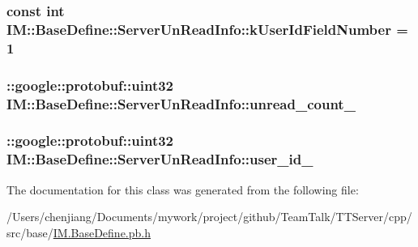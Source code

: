 \subsubsection[{k\+User\+Id\+Field\+Number}]{\setlength{\rightskip}{0pt plus 5cm}const int I\+M\+::\+Base\+Define\+::\+Server\+Un\+Read\+Info\+::k\+User\+Id\+Field\+Number = 1\hspace{0.3cm}{\ttfamily [static]}}\label{class_i_m_1_1_base_define_1_1_server_un_read_info_a482be31f066cdb6df95c468d3259c981}
\hypertarget{class_i_m_1_1_base_define_1_1_server_un_read_info_a7540121ccfaddc5aaff134c8c472cc45}{}
\subsubsection[{unread\+\_\+count\+\_\+}]{\setlength{\rightskip}{0pt plus 5cm}\+::google\+::protobuf\+::uint32 I\+M\+::\+Base\+Define\+::\+Server\+Un\+Read\+Info\+::unread\+\_\+count\+\_\+\hspace{0.3cm}{\ttfamily [private]}}\label{class_i_m_1_1_base_define_1_1_server_un_read_info_a7540121ccfaddc5aaff134c8c472cc45}
\hypertarget{class_i_m_1_1_base_define_1_1_server_un_read_info_a578032e1ab85968c80918e4aa1ae50dd}{}
\subsubsection[{user\+\_\+id\+\_\+}]{\setlength{\rightskip}{0pt plus 5cm}\+::google\+::protobuf\+::uint32 I\+M\+::\+Base\+Define\+::\+Server\+Un\+Read\+Info\+::user\+\_\+id\+\_\+\hspace{0.3cm}{\ttfamily [private]}}\label{class_i_m_1_1_base_define_1_1_server_un_read_info_a578032e1ab85968c80918e4aa1ae50dd}


The documentation for this class was generated from the following file\+:\begin{DoxyCompactItemize}
\item 
/\+Users/chenjiang/\+Documents/mywork/project/github/\+Team\+Talk/\+T\+T\+Server/cpp/src/base/\hyperlink{_i_m_8_base_define_8pb_8h}{I\+M.\+Base\+Define.\+pb.\+h}\end{DoxyCompactItemize}
